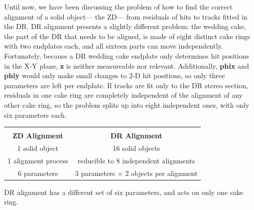 \documentclass[12pt]{article}
\begin{document}
Until now, we have been discussing the problem of how to find the
correct alignment of a solid object--- the ZD--- from residuals of
hits to tracks fitted in the DR.  DR alignment presents a slightly
different problem: the wedding cake, the part of the DR that needs to
be aligned, is made of eight distinct cake rings with two endplates
each, and all sixteen parts can move independently.  Fortunately,
because a DR wedding cake endplate only determines hit positions in
the X-Y plane, {\bf z} is neither measureable nor relevant.
Additionally, {\bf phix} and {\bf phiy} would only make small changes
to 2-D hit positions, so only three parameters are left per endplate.
If tracks are fit only to the DR stereo section, residuals in one cake
ring are completely independent of the alignment of any other cake
ring, so the problem splits up into eight independent ones, with only
six parameters each.
\begin{center}
  \begin{tabular}{c c}
    \hspace{0.45\linewidth} & \hspace{0.45\linewidth} \\
    {\bf ZD Alignment} & {\bf DR Alignment} \\\hline
    1 solid object & 16 solid objects \\
    1 alignment process & reducible to 8 independent alignments \\
    6 parameters & 3 parameters $\times$ 2 objects per alignment \\
  \end{tabular}
\end{center}
DR alignment has a different set of six parameters, and acts on only
one cake ring.
\end{document}
